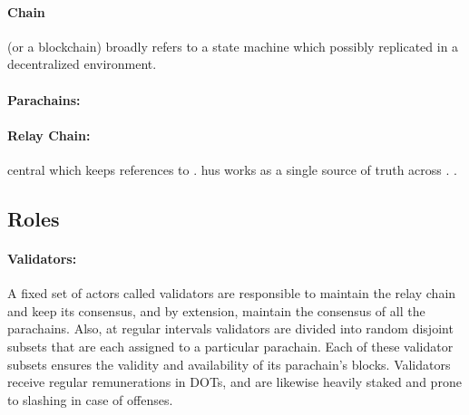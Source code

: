
\paragraph{Chain} (or a blockchain) broadly refers to a state machine which possibly replicated in a decentralized environment.

\paragraph{Parachains:} 

\paragraph{Relay Chain:}   central   which keeps references to . hus  works as a single source of truth across .
.

\subsection{Roles}

\paragraph{Validators:} A fixed set of actors called validators are responsible to maintain the relay chain
and keep its consensus, and by extension, maintain the consensus of all the parachains. Also, at regular intervals validators are divided into random disjoint subsets that are each assigned to a particular parachain.
Each of these validator subsets ensures the validity and availability of its parachain's blocks.
Validators receive regular remunerations in DOTs,
and are likewise heavily staked and prone to slashing in case of offenses.

